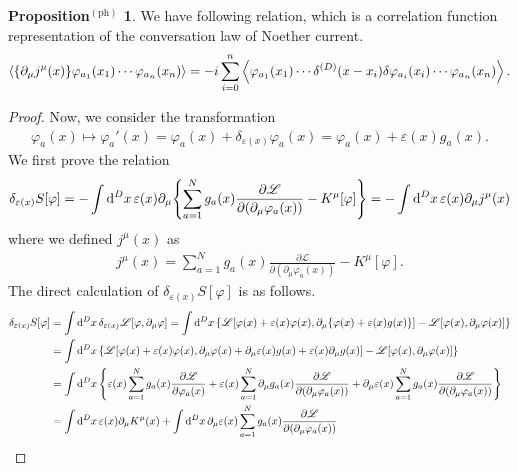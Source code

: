 \documentclass{article}
\theoremstyle{definition}
\newtheorem{propositionph}{Proposition$^\mathrm{(ph)}$}[section]
\numberwithin{equation}{section}
\renewcommand{\mapsto}{\longmapsto}
\newcommand{\intst}{\int \dd^Dx \,}
\newcommand{\del}{\partial_\mu}
\newcommand{\lag}{\mathscr{L}}
\begin{document}
\begin{propositionph}
  We have following relation, which is a correlation function representation of the conversation law of Noether current.
  \begin{align}
    \ev{\qty{\del j^\mu(x)} \varphi_{a_1}(x_1) \cdots \varphi_{a_n}(x_n)}
    = -i\sum_{i = 0}^{n} \ev{\varphi_{a_1}(x_1) \cdots \delta^{(D)}(x - x_i) \delta \varphi_{a_i}(x_i) \cdots \varphi_{a_n}(x_n)}. \label{noether-takahashi-id}
  \end{align}
\end{propositionph}
\begin{proof}
  Now, we consider the transformation
  \begin{align}
    \varphi_a(x) \mapsto \varphi_a'(x) = \varphi_a(x) + \delta_{\varepsilon(x)} \varphi_a(x) = \varphi_a(x) + \varepsilon(x) g_a(x).
  \end{align}
  We first prove the relation
  \begin{align}
    \delta_{\varepsilon(x)} S[\varphi] = - \intst \varepsilon(x) \del \qty{\sum_{a = 1}^{N} g_a(x) \frac{\partial \lag}{\partial(\partial_\mu \varphi_a(x))} - K^\mu[\varphi]}
    = - \intst \varepsilon(x) \del j^\mu(x)
  \end{align}
  where we defined $j^\mu(x)$ as
  \begin{align}
    j^\mu(x) = \sum_{a = 1}^{N} g_a(x) \frac{\partial \lag}{\partial(\partial_\mu \varphi_a(x))} - K^\mu[\varphi].
  \end{align}
  The direct calculation of $\delta_{\varepsilon(x)} S[\varphi]$ is as follows.
  \begin{align}
    \delta_{\varepsilon(x)} S[\varphi]
    &= \intst \delta_{\varepsilon(x)} \lag[\varphi, \del \varphi]
     = \intst \qty{\lag[\varphi(x) + \varepsilon(x)\varphi(x), \del \qty{\varphi(x) + \varepsilon(x)g(x)}] - \lag[\varphi(x), \del \varphi(x)]} \notag \\
    &= \intst \qty{\lag[\varphi(x) + \varepsilon(x)\varphi(x), \del \varphi(x) + \del \varepsilon(x) g(x) + \varepsilon(x) \del g(x)] - \lag[\varphi(x), \del \varphi(x)]} \notag \\
    &= \intst \qty{\varepsilon(x)\sum_{a = 1}^{N}g_a(x) \pdv{\lag}{\varphi_a(x)} + \varepsilon(x)\sum_{a = 1}^{N}\del g_a(x)\pdv{\lag}{(\del \varphi_a(x))}
      + \del \varepsilon(x) \sum_{a = 1}^{N} g_a(x) \pdv{\lag}{(\del\varphi_a(x))}} \notag \\
    &= \intst \varepsilon(x) \del K^\mu(x) + \intst \del \varepsilon(x) \sum_{a = 1}^{N} g_a(x) \pdv{\lag}{(\del\varphi_a(x))}

\end{align}
\end{proof}
\end{document}
